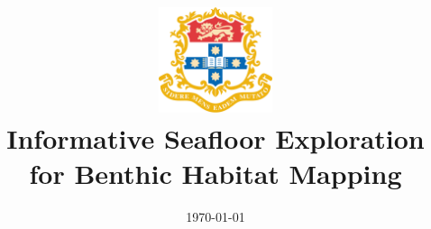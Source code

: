 \documentclass[a4paper, 12pt, twoside]{Thesis}  %
\theoremstyle{indented}
\begin{document}
\frontmatter      %
\title  {\includegraphics[width=0.25\textwidth]{Figures/University-of-Sydney.png} \\ Informative Seafloor Exploration {\Large{for}} Benthic Habitat Mapping}
\addresses  {\groupname\\\deptname\\\univname}  %
\date       {\today}
\subject    {}
\keywords   {}

\maketitle


\fancyhead{}  %
\rhead{\thepage}  %
\lhead{}  %

\pagestyle{fancy}  %
\end{document}
